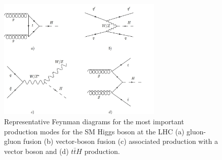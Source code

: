 \begin{figure}[htb!]
  \centering
  \includegraphics[width=0.7\textwidth]{figures/Theory/h-prod.png}
\captionsetup{width=0.85\textwidth} \caption{\small Representative Feynman diagrams for the most important production modes for the SM Higgs boson at the LHC (a) gluon-gluon fusion (b) vector-boson fusion (c) associated production with a vector boson and (d) $t\bar{t}H$ production. }
\label{fig:theo:higgsprod}
\end{figure}


